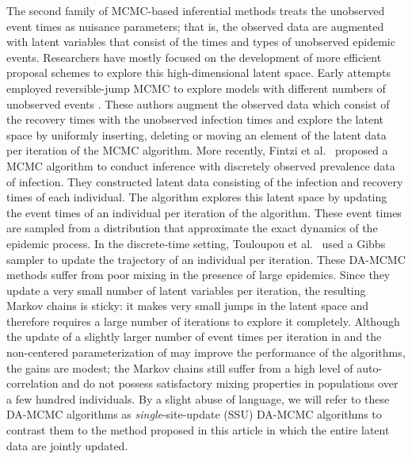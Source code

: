 \documentclass[11pt]{article}
\begin{document}
	The second family of MCMC-based inferential methods treats the unobserved event times as nuisance parameters; that is, the observed data are augmented with latent variables that consist of the times and types of unobserved epidemic events.
	Researchers have mostly focused on the development of more efficient proposal schemes to explore this high-dimensional latent space. Early attempts employed reversible-jump MCMC \cite{Green.1995} to explore models with different numbers of unobserved events \cite{Gibson.1998, ONeill.1999}. These authors augment the observed data which consist of the recovery times with the unobserved infection times and explore the latent space by uniformly inserting, deleting or moving an element of the latent data per iteration of the MCMC algorithm. 
	More recently, Fintzi et al.\ \cite{Fintzi.2017} proposed a MCMC algorithm to conduct inference with discretely observed prevalence data of infection. They constructed latent data consisting of the infection and recovery times of each individual. The algorithm explores this latent space by updating the event times of an individual per iteration of the algorithm. These event times are sampled from a distribution that approximate the exact dynamics of the epidemic process.
	In the discrete-time setting, Touloupou et al.\ \cite{Touloupou.2020} used a Gibbs sampler to update the trajectory of an individual per iteration.
	These DA-MCMC methods suffer from poor mixing in the presence of large epidemics. Since they update a very small number of latent variables per iteration, the resulting Markov chains is sticky: it makes very small jumps in the latent space and therefore requires a large number of iterations to explore it completely.
	Although the update of a slightly larger number of event times per iteration in \cite{Pooley.2015} and the non-centered parameterization of \cite{Neal.2005} may improve the performance of the algorithms, the gains are modest; the Markov chains still suffer from a high level of auto-correlation and do not possess satisfactory mixing properties in populations over a few hundred individuals.
	By a slight abuse of language, we will refer to these DA-MCMC algorithms as \textit{single}-site-update (SSU) DA-MCMC algorithms to contrast them to the method proposed in this article in which the entire latent data are jointly updated.
	
	
\end{document}
